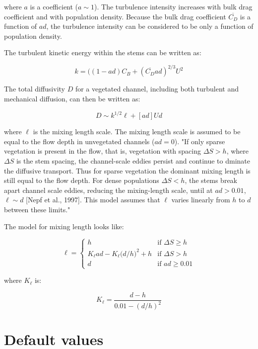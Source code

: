 \documentclass[11pt]{article}
\begin{document}
\noindent where $a$ is a coefficient ($a\sim1$). The turbulence intensity increases with bulk drag coefficient and with population density. Because the bulk drag coefficient $\overline{C_D}$ is a function of $ad$, the turbulence intensity can be considered to be only a function of population density.

The turbulent kinetic energy within the stems can be written as:

\begin{equation}
k = ((1 - ad) C_B + (\overline{C_D} ad)^{2/3} U^2
\end{equation}

The total diffusivity $D$ for a vegetated channel, including both turbulent and mechanical diffusion, can then be written as:

\begin{equation}
D \sim k^{1/2} \ell + [ad]Ud
\end{equation}

\noindent where $\ell$ is the mixing length scale. The mixing length scale is assumed to be equal to the flow depth in unvegetated channels ($ad = 0$). "If only sparse vegetation is present in the flow, that is, vegetation with spacing $\Delta S > h$, where $\Delta S$ is the stem spacing, the channel-scale eddies persist and continue to dminate the diffusive transport. Thus for sparse vegetation the dominant mixing length is still equal to the flow depth. For dense populations $\Delta S < h$, the stems break apart channel scale eddies, reducing the mixing-length scale, until at $ad > 0.01$, $\ell \sim d$ [Nepf et al., 1997]. This model assumes that $\ell$ varies linearly from $h$ to $d$ between these limits."

The model for mixing length looks like:

\[
 \ell = 
  \begin{cases} 
   h & \text{if } \Delta S \geq h \\
   K_\ell ad - K_\ell \big(d/h\big)^2 + h    & \text{if } \Delta S > h \\
   d & \text{if } ad \geq 0.01
  \end{cases}
\]

\noindent where $K_\ell$ is:

\begin{equation}
K_\ell = \frac{d-h}{0.01 - (d/h)^2}
\end{equation}

\section{Default values}
\end{document}
